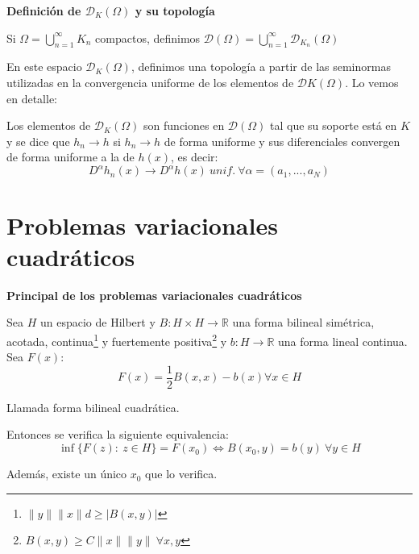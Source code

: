 \documentclass[openany]{book}
\begin{document}
\begin{definition}
    \textbf{Definición de $ \mathcal{D}_{K}(\Omega )$ y su topología}

    Si $ \Omega  = \bigcup\limits_{n=1}^{\infty} K_n$ compactos, definimos $ \mathcal{D}(\Omega ) = \bigcup_{n=1}^{\infty} \mathcal{D}_{K_n}(\Omega )$

    En este espacio $ \mathcal{D}_{K}(\Omega )$, definimos una topología a partir de las seminormas utilizadas en la convergencia uniforme de los elementos de $ \mathcal{D}K(\Omega )$. Lo vemos en detalle:

    Los elementos de $ \mathcal{D}_{K}(\Omega )$ son funciones en $ \mathcal{D}(\Omega )$ tal que su soporte está en $ K$ y se dice que $ h_n \to h$ si $ h_n\to h$ de forma uniforme y sus diferenciales convergen de forma uniforme a la de $ h(x)$, es decir:
    $$ D^{\alpha}h_n(x) \to D^{\alpha} h(x)\ unif.\ \forall \alpha = (a_1,...,a_N)$$
\end{definition}





\section{Problemas variacionales cuadráticos}

\begin{theorem}
    \textbf{Principal de los problemas variacionales cuadráticos}

    Sea $ H$ un espacio de Hilbert y $ B: H \times H \to \mathbb{R}$ una forma bilineal simétrica, acotada, continua\footnote{$ \|y\|\|x\| d \geq  |B(x,y)|$} y fuertemente positiva\footnote{$ B(x,y) \geq  C \|x\|\|y\|\ \forall x,y$} y $ b: H \to \mathbb{R}$ una forma lineal continua. Sea $ F(x)$:
    $$ F(x) = \dfrac{1}{2}B(x,x) -b(x) \forall  x \in H $$ 

    Llamada forma bilineal cuadrática.

    Entonces se verifica la siguiente equivalencia:
    $$ \inf \{F(z):\  z \in H\} = F(x_0) \iff B(x_0,y) = b(y)\  \forall  y \in H$$

    Además, existe un único $ x_0$ que lo verifica.
\end{theorem}
\end{document}
